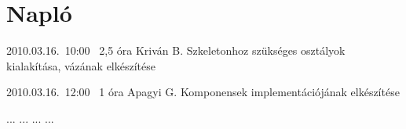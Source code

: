 %
\section{Napló}

\begin{naplo}

\bejegyzes
{2010.03.16.~10:00~} %
{2,5 óra} %
{Kriván B.} %
{Szkeletonhoz szükséges osztályok kialakítása, vázának elkészítése} %

\bejegyzes
{2010.03.16.~12:00~} %
{1 óra} %
{Apagyi G.} %
{Komponensek implementációjának elkészítése} %


\bejegyzes
{...}
{...}
{...}
{...}


\end{naplo}

